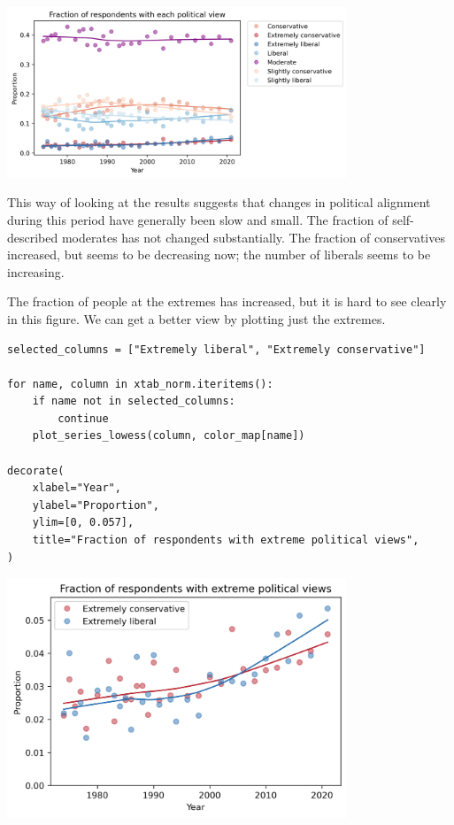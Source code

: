\begin{center}
\includegraphics[width=4in]{chapters/02_polviews_files/02_polviews_88_0.png}
\end{center}

This way of looking at the results suggests that changes in political
alignment during this period have generally been slow and small. The
fraction of self-described moderates has not changed substantially. The
fraction of conservatives increased, but seems to be decreasing now; the
number of liberals seems to be increasing.

The fraction of people at the extremes has increased, but it is hard to
see clearly in this figure. We can get a better view by plotting just
the extremes.

\begin{lstlisting}[]
selected_columns = ["Extremely liberal", "Extremely conservative"]

for name, column in xtab_norm.iteritems():
    if name not in selected_columns:
        continue
    plot_series_lowess(column, color_map[name])

decorate(
    xlabel="Year",
    ylabel="Proportion",
    ylim=[0, 0.057],
    title="Fraction of respondents with extreme political views",
)
\end{lstlisting}

\begin{center}
\includegraphics[width=4in]{chapters/02_polviews_files/02_polviews_90_0.png}
\end{center}

